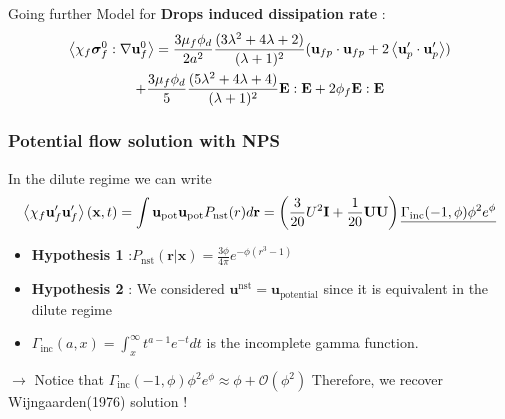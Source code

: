 \documentclass{sintefbeamer}
\begin{document}
\backmatter
\begin{frame}
  

  

\end{frame}
\begin{frame}
  {Going further}
   Model for \textbf{Drops induced dissipation rate} : 
   \begin{multline*}
    \left<\chi_f \bm\sigma_f^0 :\mathbf{\nabla}\textbf{u}_f^0\right>
    =
    \frac{3\mu_f \phi_d}{2a^2}
    \frac{(3\lambda^2 + 4\lambda +2)}{(\lambda + 1)^2}
    (\textbf{u}_{fp}\cdot \textbf{u}_{fp} + 2 \left<\textbf{u}_p'\cdot\textbf{u}_p'\right>) \\
    + 
    \frac{3\mu_f \phi_d}{5}
    \frac{(5\lambda^2 + 4\lambda +4)}{(\lambda + 1)^2}
    \textbf{E}:\textbf{E}
    +2 \phi_f \textbf{E}:\textbf{E}
\end{multline*}
\end{frame}

\begin{frame}
  \frametitle{Potential flow solution with NPS}
  In the dilute regime we can write 
  \begin{multline*}
    \left<\chi_f \textbf{u}'_f\textbf{u}'_f\right>(\textbf{x},t)
    = 
    {\int \textbf{u}_\text{pot} \textbf{u}_\text{pot}  
    P_\text{nst}(r) d\textbf{r} }
    =  \left(\frac{3}{20} U^2\textbf{I} + \frac{1}{20}\textbf{UU} \right)
    \underline{\Gamma_\text{inc}(-1,\phi)\phi^2 e^\phi}
  \end{multline*}

  \begin{itemize}
    \item  \textbf{Hypothesis 1} :$P_\text{nst}(\textbf{r}|\textbf{x}) = \frac{3\phi}{4\pi}
    e^{ - \phi (r^3 - 1) }$
    \item \textbf{Hypothesis 2} : We considered $\textbf{u}^\text{nst} = \textbf{u}_\text{potential}$ since it is equivalent in the dilute regime
    \item $\Gamma_\text{inc}(a,x) = \int_x^\infty t^{a-1} e^{-t} dt $ is the incomplete gamma  function. 
  \end{itemize}

  $\to$ Notice that $\Gamma_\text{inc}(-1,\phi)\phi^2 e^\phi \approx  \phi + \mathcal{O}(\phi^2)$ Therefore, we recover  Wijngaarden(1976) solution ! 

\end{frame}
\end{document}

